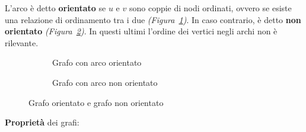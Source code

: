 \documentclass[italian, 10pt]{article}
\begin{document}
L'arco è detto \textbf{orientato} se \(u\) e \(v\) sono coppie di nodi ordinati, ovvero se esiste una relazione di ordinamento tra i due \textit{(Figura~\ref{fig:grafo-arco-orientato})}.
In caso contrario, è detto \textbf{non orientato} \textit{(Figura~\ref{fig:grafo-arco-non-orientato})}.
In questi ultimi l'ordine dei vertici negli archi non è rilevante.

\begin{figure}[htbp]
  \bigskip
  \centering
  \begin{subfigure}[t]{0.495\textwidth}
    \centering
    \caption{Grafo con arco orientato}
    \label{fig:grafo-arco-orientato}
  \end{subfigure}
  \begin{subfigure}[t]{0.495\textwidth}
    \centering
    \caption{Grafo con arco non orientato}
    \label{fig:grafo-arco-non-orientato}
  \end{subfigure}
  \caption{Grafo orientato e grafo non orientato}
  \label{fig:grafo-orientato-non-orientato}
  \bigskip
\end{figure}

\bigskip
\textbf{Proprietà} dei grafi:
\end{document}
